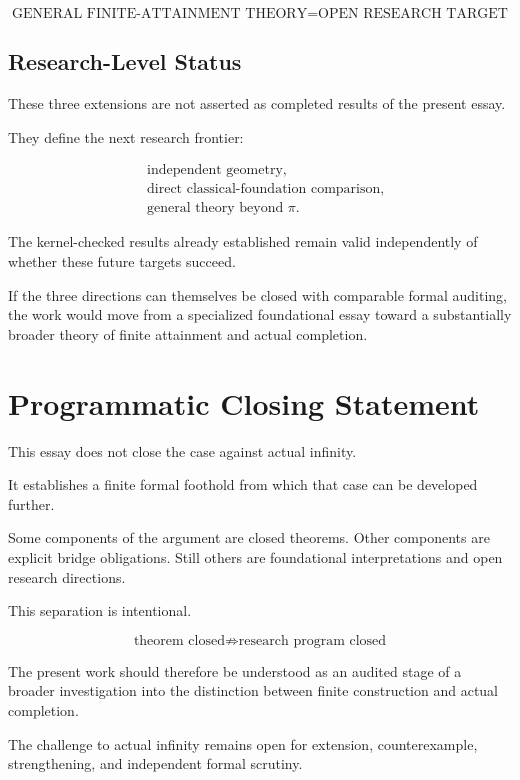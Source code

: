 \documentclass[11pt,a4paper]{article}
\begin{document}
\[
\boxed{
\text{GENERAL FINITE-ATTAINMENT THEORY}
=
\text{OPEN RESEARCH TARGET}
}
\]

\subsection{Research-Level Status}

These three extensions are not asserted as completed results of the
present essay.

They define the next research frontier:

\[
\boxed{
\begin{aligned}
&\text{independent geometry},\\
&\text{direct classical-foundation comparison},\\
&\text{general theory beyond }\pi.
\end{aligned}
}
\]

The kernel-checked results already established remain valid independently
of whether these future targets succeed.

If the three directions can themselves be closed with comparable formal
auditing, the work would move from a specialized foundational essay
toward a substantially broader theory of finite attainment and actual
completion.


\section*{Programmatic Closing Statement}

This essay does not close the case against actual infinity.

It establishes a finite formal foothold from which that case can be
developed further.

Some components of the argument are closed theorems. Other components
are explicit bridge obligations. Still others are foundational
interpretations and open research directions.

This separation is intentional.

\[
\boxed{
\text{theorem closed}
\not\Rightarrow
\text{research program closed}
}
\]

The present work should therefore be understood as an audited stage of
a broader investigation into the distinction between finite
construction and actual completion.

The challenge to actual infinity remains open for extension,
counterexample, strengthening, and independent formal scrutiny.
\end{document}
